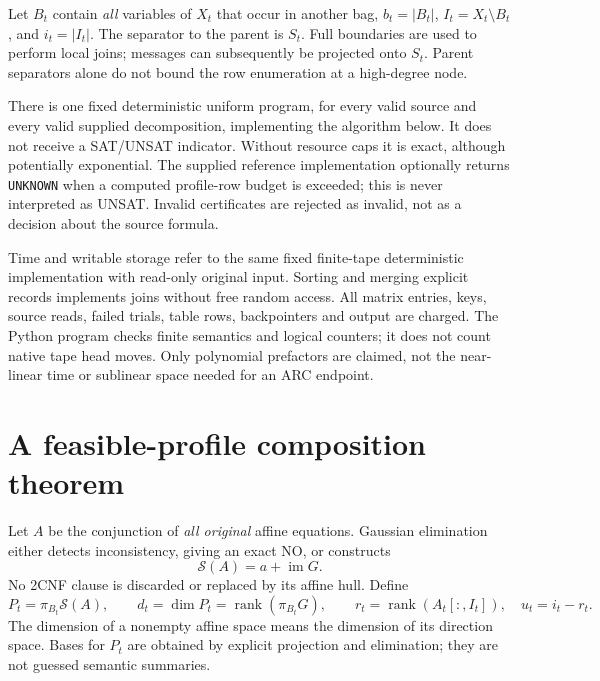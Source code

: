 \documentclass[11pt]{article}
\begin{document}
Let $B_t$ contain \emph{all} variables of $X_t$ that occur in another bag, $b_t=|B_t|$, $I_t=X_t\setminus B_t$, and $i_t=|I_t|$. The separator to the parent is $S_t$. Full boundaries are used to perform local joins; messages can subsequently be projected onto $S_t$. Parent separators alone do not bound the row enumeration at a high-degree node.

There is one fixed deterministic uniform program, for every valid source and every valid supplied decomposition, implementing the algorithm below. It does not receive a SAT/UNSAT indicator. Without resource caps it is exact, although potentially exponential. The supplied reference implementation optionally returns \texttt{UNKNOWN} when a computed profile-row budget is exceeded; this is never interpreted as UNSAT. Invalid certificates are rejected as invalid, not as a decision about the source formula.

Time and writable storage refer to the same fixed finite-tape deterministic implementation with read-only original input. Sorting and merging explicit records implements joins without free random access. All matrix entries, keys, source reads, failed trials, table rows, backpointers and output are charged. The Python program checks finite semantics and logical counters; it does not count native tape head moves. Only polynomial prefactors are claimed, not the near-linear time or sublinear space needed for an ARC endpoint.

\section{A feasible-profile composition theorem}
Let $A$ be the conjunction of \emph{all original} affine equations. Gaussian elimination either detects inconsistency, giving an exact NO, or constructs
\[
 \mathcal S(A)=a+\operatorname{im}G.
\]
No 2CNF clause is discarded or replaced by its affine hull. Define
\[
 P_t=\pi_{B_t}\mathcal S(A),\qquad
 d_t=\dim P_t=\operatorname{rank}(\pi_{B_t}G),\qquad
 r_t=\operatorname{rank}(A_t[:,I_t]),\quad u_t=i_t-r_t.
\]
The dimension of a nonempty affine space means the dimension of its direction space. Bases for $P_t$ are obtained by explicit projection and elimination; they are not guessed semantic summaries.
\end{document}
